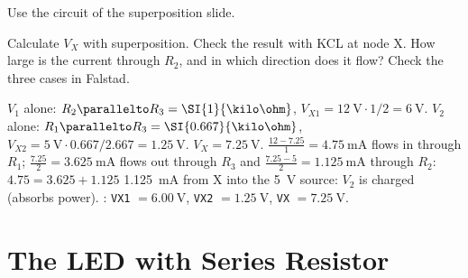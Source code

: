 Use the circuit of the superposition slide.
\begin{talist}
\ta Calculate $V_X$ with superposition.
\ta Check the result with KCL at node X.
\ta How large is the current through $R_2$, and in which direction does it flow?
\ta Check the three cases in Falstad.
\end{talist}

\begin{solution}
\begin{talist}
\ta $V_1$ alone: $R_2\parallelto R_3 = \SI{1}{\kilo\ohm}$, $V_{X1} = \SI{12}{\volt}\cdot 1/2 = \SI{6}{\volt}$.
    $V_2$ alone: $R_1\parallelto R_3 = \SI{0.667}{\kilo\ohm}$, $V_{X2} = \SI{5}{\volt}\cdot 0.667/2.667 = \SI{1.25}{\volt}$.
    $V_X = \SI{7.25}{\volt}$.
\ta $\frac{12-7.25}{1} = \SI{4.75}{\milli\ampere}$ flows in through $R_1$;
    $\frac{7.25}{2} = \SI{3.625}{\milli\ampere}$ flows out through $R_3$ and
    $\frac{7.25-5}{2} = \SI{1.125}{\milli\ampere}$ through $R_2$: $4.75 = 3.625+1.125$ \checkmark
\ta \SI{1.125}{\milli\ampere} from X into the \SI{5}{\volt} source: $V_2$ is charged (absorbs power).
\ta {}: \texttt{VX1} $=\SI{6.00}{\volt}$, \texttt{VX2} $=\SI{1.25}{\volt}$, \texttt{VX} $=\SI{7.25}{\volt}$.
\end{talist}
\end{solution}

\section{The LED with Series Resistor}

